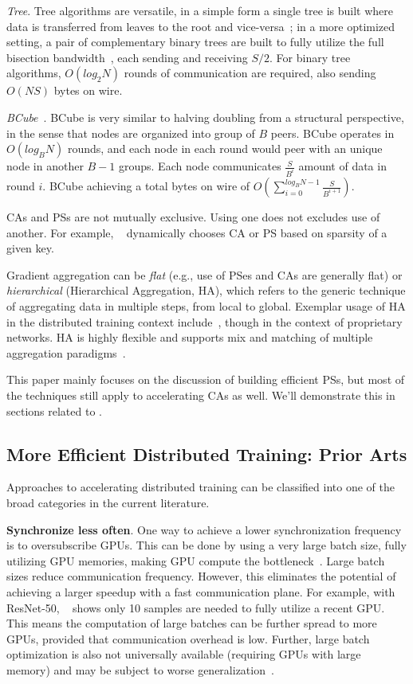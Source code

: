 \noindent\textit{Tree}. Tree algorithms are versatile, in a simple form a single tree is built where data is transferred from leaves to the root and vice-versa~\cite{firecaffe}; in a more optimized setting, a pair of complementary binary trees are built to fully utilize the full bisection bandwidth~\cite{dbt}, each sending and receiving $S/2$. For binary tree \collectives algorithms, $O(log_2N)$ rounds of communication are required, also sending $O(NS)$ bytes on wire. 

\noindent\textit{BCube}~\cite{glooalgo70:online}. BCube is very similar to halving doubling from a structural perspective, in the sense that nodes are organized into group of $B$ peers. BCube operates in $O(log_BN)$ rounds, and each node in each round would peer with an unique node in another $B-1$ groups. Each node communicates $\frac{S}{B^i}$ amount of data in round $i$. BCube achieving a total bytes on wire of $O(\sum_{i=0}^{log_BN-1}\frac{S}{B^{i+1}})$.

CAs and PSs are not mutually exclusive. Using one does not excludes use of another. For example, ~\cite{10.1145/3302424.3303957} dynamically chooses CA or PS based on sparsity of a given key.

Gradient aggregation can be \textit{flat} (e.g., use of PSes and CAs are generally flat) or \textit{hierarchical} (Hierarchical Aggregation, HA), which refers to the generic technique of aggregating data in multiple steps, from local to global. Exemplar usage of HA in the distributed training context include~\cite{firecaffe,choblueconnect,Geng:2018:HHP:3229543.3229544,sysmlblueconnect}, though in the context of proprietary networks. HA is highly flexible and supports mix and matching of multiple aggregation paradigms~\cite{topoawarempi, cool}.

This paper mainly focuses on the discussion of building efficient PSs, but most of the techniques still apply to accelerating CAs as well. We'll demonstrate this in sections related to \cmpi. 

\subsection{More Efficient Distributed Training: Prior Arts}
Approaches to accelerating distributed training can be classified into one of the broad categories in the current literature.

\noindent\textbf{Synchronize less often}. One way to achieve a lower synchronization frequency is to oversubscribe GPUs. This can be done by using a very large batch size, fully utilizing GPU memories, making GPU compute the bottleneck~\cite{Nowanyon13:online, ImageNetIn1Hour, sridharan2018scaleout, jia2018highly}. Large batch sizes reduce communication frequency. However, this eliminates the potential of achieving a larger speedup with a fast communication plane. For example, with ResNet-50, ~\cite{Shen2018NexusA} shows only 10 samples are needed to fully utilize a recent GPU. This means the computation of large batches can be further spread to more GPUs, provided that communication overhead is low. Further, large batch optimization is also not universally available (requiring GPUs with large memory) and may be subject to worse generalization~\cite{keskar2016large}.

